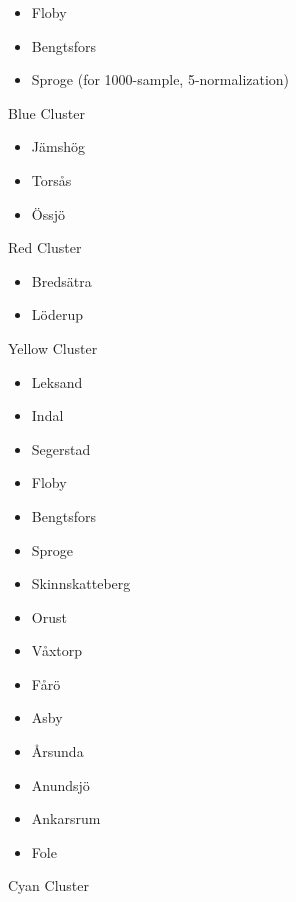\begin{figure}
\begin{itemize}
\item Floby
\item Bengtsfors
\item Sproge (for 1000-sample, 5-normalization)
\end{itemize}
\caption{Blue Cluster}
\label{blue-cluster}
\end{figure}

\begin{figure}
\begin{itemize}
\item J\"amsh\"og
\item Tors\aa{}s
\item \"Ossj\"o
\end{itemize}
\caption{Red Cluster}
\label{red-cluster}
\end{figure}

\begin{figure}
\begin{itemize}
\item Breds\"atra
\item L\"oderup
\end{itemize}
\caption{Yellow Cluster}
\label{yellow-cluster}
\end{figure}

\begin{figure}
\begin{itemize}
\item Leksand
\item Indal
\item Segerstad
\item Floby
\item Bengtsfors
\item Sproge
\item Skinnskatteberg
\item Orust
\item V\aa{}xtorp
\item F\aa{}r\"o
\item Asby
\item \AA{}rsunda
\item Anundsj\"o
\item Ankarsrum
\item Fole
\end{itemize}
\caption{Cyan Cluster}
\label{cyan-cluster}
\end{figure}


